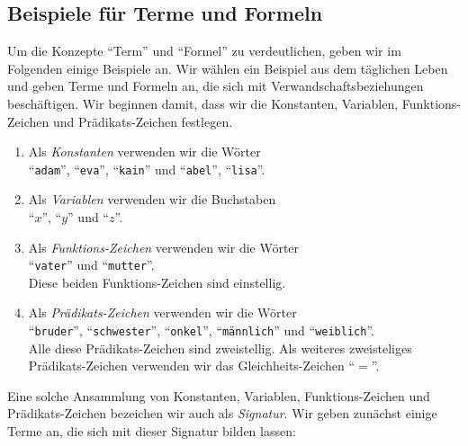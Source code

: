 \subsection{Beispiele f\"{u}r Terme und Formeln}
Um die Konzepte ``Term'' und ``Formel'' zu verdeutlichen, geben wir im Folgenden einige
Beispiele an.  Wir w\"{a}hlen ein Beispiel aus dem t\"{a}glichen Leben und geben Terme und Formeln an, die sich mit
Verwandschaftsbeziehungen besch\"{a}ftigen.  Wir beginnen damit, dass wir die Konstanten,
Variablen, Funktions-Zeichen und Pr\"{a}dikats-Zeichen festlegen.
\begin{enumerate}
\item Als \emph{Konstanten} verwenden wir die W\"{o}rter \\[0.2cm]
      \hspace*{1.3cm} ``\texttt{adam}'', ``\texttt{eva}'', ``\texttt{kain}'' und ``\texttt{abel}'',
      ``\texttt{lisa}''.
\item Als \emph{Variablen} verwenden wir die Buchstaben \\[0.2cm]
      \hspace*{1.3cm} ``$x$'', ``$y$'' und ``$z$''.
\item Als \emph{Funktions-Zeichen} verwenden wir die W\"{o}rter \\[0.2cm]
      \hspace*{1.3cm} ``\texttt{vater}'' und ``\texttt{mutter}''. \\[0.2cm]
      Diese beiden Funktions-Zeichen sind einstellig. 
\item Als \emph{Pr\"{a}dikats-Zeichen} verwenden wir die W\"{o}rter \\[0.2cm]
      \hspace*{1.3cm} ``\texttt{bruder}'', ``\texttt{schwester}'', ``\texttt{onkel}'',
      ``\texttt{m\"{a}nnlich}'' und ``\texttt{weiblich}''. \\[0.2cm]
      Alle diese Pr\"{a}dikats-Zeichen sind zweistellig.  Als weiteres zweisteliges
      Pr\"{a}dikats-Zeichen verwenden wir das Gleichheits-Zeichen ``$=$''.
\end{enumerate}
Eine solche Ansammlung von Konstanten,
Variablen, Funktions-Zeichen und Pr\"{a}dikats-Zeichen bezeichen wir auch als
\emph{Signatur}.  Wir geben zun\"{a}chst einige Terme an, die sich mit dieser Signatur
bilden lassen:
